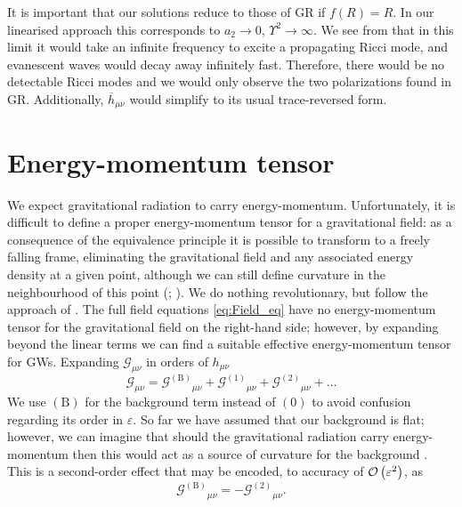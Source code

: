 It is important that our solutions reduce to those of GR if $f(R) = R$. In our linearised approach this corresponds to $a_2 \rightarrow 0$, $\Upsilon^2 \rightarrow \infty$. We see from  that in this limit it would take an infinite frequency to excite a propagating Ricci mode, and evanescent waves would decay away infinitely fast. Therefore, there would be no detectable Ricci modes and we would only observe the two polarizations found in GR. Additionally, $\overline{h}_{\mu\nu}$ would simplify to its usual trace-reversed form.

\section{Energy-momentum tensor}\label{sec:EM_tensor}

We expect gravitational radiation to carry energy-momentum. Unfortunately, it is difficult to define a proper energy-momentum tensor for a gravitational field: as a consequence of the equivalence principle it is possible to transform to a freely falling frame, eliminating the gravitational field and any associated energy density at a given point, although we can still define curvature in the neighbourhood of this point (\citealt[section 20.4]{Misner1973}; \citealt[section 17.11]{Hobson2006}). We do nothing revolutionary, but follow the approach of \citet{Isaacson1968, Isaacson1968a}. The full field equations \eqref{eq:Field_eq} have no energy-momentum tensor for the gravitational field on the right-hand side; however, by expanding beyond the linear terms we can find a suitable effective energy-momentum tensor for GWs. Expanding $\mathcal{G}_{\mu\nu}$ in orders of $h_{\mu\nu}$
\begin{equation}
\mathcal{G}_{\mu\nu} = {\mathcal{G}^{(\text{B})}}_{\mu\nu} + {\mathcal{G}^{(1)}}_{\mu\nu} + {\mathcal{G}^{(2)}}_{\mu\nu} + \ldots
\label{eq:G_exp}
\end{equation}
We use $(\text{B})$ for the background term instead of $(0)$ to avoid confusion regarding its order in $\varepsilon$. So far we have assumed that our background is flat; however, we can imagine that should the gravitational radiation carry energy-momentum then this would act as a source of curvature for the background \citep[section 4.4b]{Wald1984}. This is a second-order effect that may be encoded, to accuracy of $\mathcal{O}\left({\varepsilon^2}\right)$, as \citep[section 15.4]{Rindler2006}
\begin{equation}
{\mathcal{G}^{(\text{B})}}_{\mu\nu} = -{\mathcal{G}^{(2)}}_{\mu\nu}.
\end{equation}
